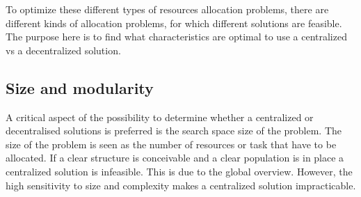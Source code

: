 To optimize these different types of resources allocation problems, there are different kinds of allocation problems, for which different solutions are feasible. The purpose here is to find what characteristics are optimal to use a centralized vs a decentralized solution.







\subsection{Size and modularity}
A critical aspect of the possibility to determine whether a centralized or decentralised solutions is preferred is the search space size of the problem. The size of the problem is seen as the number of resources or task that have to be allocated.  If a clear structure is conceivable and a clear population is in place a centralized solution is infeasible. This is due to the global overview. However, the high sensitivity to size and complexity makes a centralized solution impracticable.



